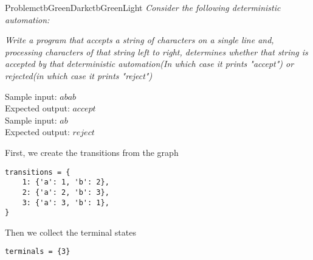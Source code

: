 \documentclass[12pt]{simple_doc}
\begin{document}

    \begin{cbstripe}{Problem}{ctbGreenDark}{ctbGreenLight}
        \textit{Consider the following deterministic automation:}

        \begin{center}
        \end{center}

        \textit{Write a program that accepts a string of characters on a single line and,
            processing characters of that string left to right, determines whether that
            string is accepted by that deterministic automation(In which case it prints
            "accept") or rejected(in which case it prints "reject") } \medskip

        Sample input: $abab$\\
        Expected output: $accept$ \\

        Sample input: $ab$\\
        Expected output: $reject$

    \end{cbstripe}

    First, we create the transitions from the graph
    \begin{verbatim}
transitions = {
    1: {'a': 1, 'b': 2},
    2: {'a': 2, 'b': 3},
    3: {'a': 3, 'b': 1},
}
    \end{verbatim}

    Then we collect the terminal states
    \begin{verbatim}
terminals = {3}
    \end{verbatim}
\end{document}
